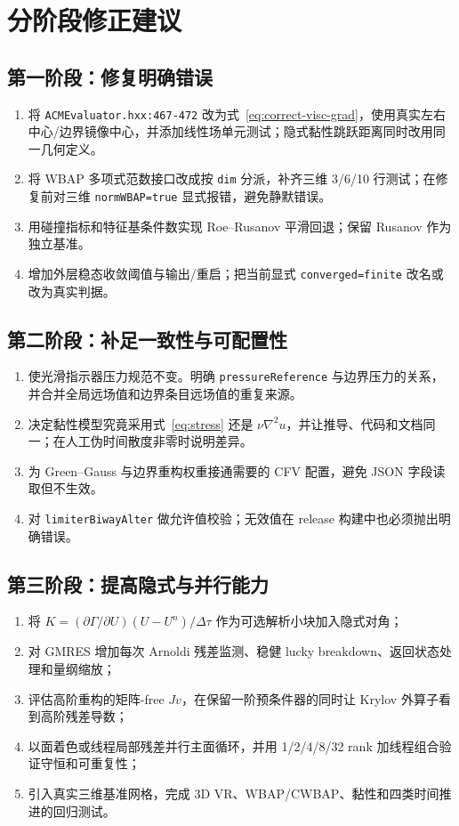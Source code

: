\documentclass[UTF8,11pt,a4paper]{ctexart}
\newcommand{\code}[1]{\nolinkurl{#1}}
\begin{document}
\section{分阶段修正建议}

\subsection{第一阶段：修复明确错误}

\begin{enumerate}
  \item 将 \code{ACMEvaluator.hxx:467-472} 改为式~\eqref{eq:correct-visc-grad}，使用真实左右中心/边界镜像中心，并添加线性场单元测试；隐式黏性跳跃距离同时改用同一几何定义。
  \item 将 WBAP 多项式范数接口改成按 \code{dim} 分派，补齐三维 3/6/10 行测试；在修复前对三维 \code{normWBAP=true} 显式报错，避免静默错误。
  \item 用碰撞指标和特征基条件数实现 Roe--Rusanov 平滑回退；保留 Rusanov 作为独立基准。
  \item 增加外层稳态收敛阈值与输出/重启；把当前显式 \code{converged=finite} 改名或改为真实判据。
\end{enumerate}

\subsection{第二阶段：补足一致性与可配置性}

\begin{enumerate}
  \item 使光滑指示器压力规范不变。明确 \code{pressureReference} 与边界压力的关系，并合并全局远场值和边界条目远场值的重复来源。
  \item 决定黏性模型究竟采用式~\eqref{eq:stress} 还是 $\nu\nabla^2u$，并让推导、代码和文档同一；在人工伪时间散度非零时说明差异。
  \item 为 Green--Gauss 与边界重构权重接通需要的 CFV 配置，避免 JSON 字段读取但不生效。
  \item 对 \code{limiterBiwayAlter} 做允许值校验；无效值在 release 构建中也必须抛出明确错误。
\end{enumerate}

\subsection{第三阶段：提高隐式与并行能力}

\begin{enumerate}
  \item 将 $K=(\partial\Gamma/\partial U)(U-U^n)/\Delta\tau$ 作为可选解析小块加入隐式对角；
  \item 对 GMRES 增加每次 Arnoldi 残差监测、稳健 lucky breakdown、返回状态处理和量纲缩放；
  \item 评估高阶重构的矩阵-free $Jv$，在保留一阶预条件器的同时让 Krylov 外算子看到高阶残差导数；
  \item 以面着色或线程局部残差并行主面循环，并用 1/2/4/8/32 rank 加线程组合验证守恒和可重复性；
  \item 引入真实三维基准网格，完成 3D VR、WBAP/CWBAP、黏性和四类时间推进的回归测试。
\end{enumerate}
\end{document}
